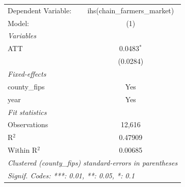 
\begingroup
\centering
\begin{tabular}{lc}
   \tabularnewline \midrule \midrule
   Dependent Variable: & ihs(chain\_farmers\_market)\\    
   Model:              & (1)\\  
   \midrule
   \emph{Variables}\\
   ATT                 & 0.0483$^{*}$\\   
                       & (0.0284)\\   
   \midrule
   \emph{Fixed-effects}\\
   county\_fips        & Yes\\  
   year                & Yes\\  
   \midrule
   \emph{Fit statistics}\\
   Observations        & 12,616\\  
   R$^2$               & 0.47909\\  
   Within R$^2$        & 0.00685\\  
   \midrule \midrule
   \multicolumn{2}{l}{\emph{Clustered (county\_fips) standard-errors in parentheses}}\\
   \multicolumn{2}{l}{\emph{Signif. Codes: ***: 0.01, **: 0.05, *: 0.1}}\\
\end{tabular}
\par\endgroup


